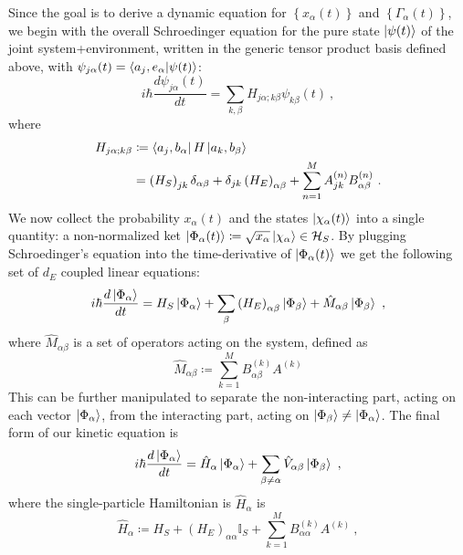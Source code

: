\documentclass[%
 reprint,
 superscriptaddress,
 aps,
 pra,
]{revtex4-2}
\theoremstyle{definition}
\begin{document}
Since the goal is to derive a dynamic equation for $\left\{x_\alpha(t) \right\}$ and $\left\{\Gamma_\alpha(t)\right\}$,
we begin with the overall Schroedinger equation for the pure state $\ket{\psi(t)}$ of the joint system+environment, written
in the generic tensor product basis defined above, with $\psi_{j\alpha}(t) = \braket{a_j,e_\alpha}{\psi(t)}$:
\begin{equation}
i\hbar \frac{d \psi_{j\alpha}(t)}{dt} = \sum_{k,\beta} H_{j\alpha;k\beta} \psi_{k\beta}(t)~,
\end{equation}
where
\begin{align}
H_{j\alpha;k\beta} &\coloneqq \bra{a_j,b_\alpha} H \ket{a_k,b_\beta}\\
&= \left(H_S\right)_{jk}\delta_{\alpha \beta} + \delta_{jk} \left(H_E\right)_{\alpha \beta} + \sum_{n=1}^M A_{jk}^{(n)} B^{(n)}_{\alpha \beta}~.\nonumber 
\end{align}
We now collect the probability $x_\alpha(t)$ and the states $\ket{\chi_\alpha(t)}$ into
a single quantity: a non-normalized ket $\ket{\Phi_\alpha(t)} \coloneqq \sqrt{x_\alpha}\ket{\chi_\alpha} \in \mathcal{H}_S$.
By plugging Schroedinger's equation into the time-derivative of $\ket{\Phi_\alpha(t)}$ we get the following set of $d_E$
coupled linear equations:
\begin{equation}
i\hbar \frac{d \ket{\Phi_\alpha}}{dt} = H_S \ket{\Phi_\alpha} + \sum_{\beta} \left( H_E\right)_{\alpha\beta}\ket{\Phi_\beta} + \hat{M}_{\alpha \beta}\ket{\Phi_\beta}~,
\end{equation}
where $\hat{M}_{\alpha\beta}$ is a set of operators acting on the system, defined as 
\begin{equation}
\hat{M}_{\alpha \beta} \coloneqq \sum_{k=1}^M B^{(k)}_{\alpha\beta} A^{(k)}
\end{equation}
This can be further manipulated to separate the non-interacting part, acting on each vector $\ket{\Phi_\alpha}$, 
from the interacting part, acting on $\ket{\Phi_\beta}\neq \ket{\Phi_\alpha}$. The final form of our kinetic equation is
\begin{equation}
i\hbar \frac{d \ket{\Phi_\alpha}}{dt} = \hat{H}_\alpha \ket{\Phi_\alpha} + \sum_{\beta \neq \alpha} \hat{V}_{\alpha \beta}\ket{\Phi_\beta}~,\label{eq:kinetic}
\end{equation}
where the single-particle Hamiltonian is $\hat{H}_\alpha$ is
\begin{equation}
\hat{H}_\alpha \coloneqq H_S + \left( H_E\right)_{\alpha \alpha} \mathbb{I}_S + \sum_{k=1}^M B^{(k)}_{\alpha \alpha}A^{(k)}~,\label{ed:def_Halpha}
\end{equation}
\end{document}
